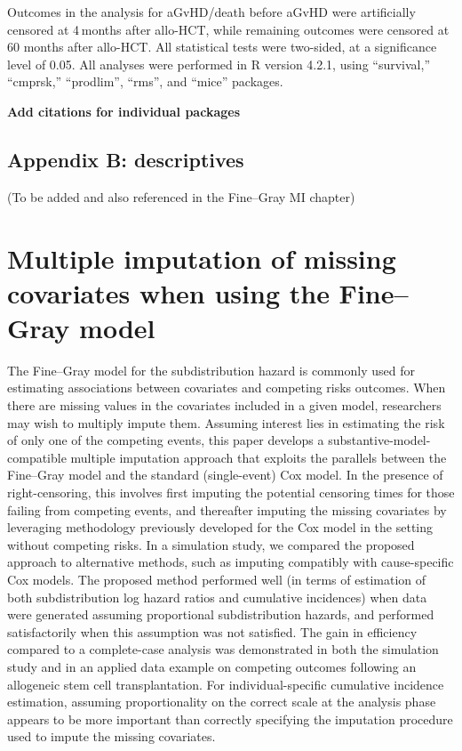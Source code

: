 \documentclass[
  letterpaper,
  DIV=11,
  numbers=noendperiod]{scrreprt}
\begin{document}
Outcomes in the analysis for aGvHD/death before aGvHD were artificially
censored at 4 months after allo-HCT, while remaining outcomes were
censored at 60 months after allo-HCT. All statistical tests were
two-sided, at a significance level of 0.05. All analyses were performed
in R version 4.2.1, using ``survival,'' ``cmprsk,'' ``prodlim'',
``rms'', and ``mice'' packages.

\textbf{Add citations for individual packages}

\section*{Appendix B: descriptives}\label{appendix-b-descriptives}


(To be added and also referenced in the Fine--Gray MI chapter)


\chapter{Multiple imputation of missing covariates when using the
Fine--Gray model}\label{sec-chap-FG-MI}

The Fine--Gray model for the subdistribution hazard is commonly used for
estimating associations between covariates and competing risks outcomes.
When there are missing values in the covariates included in a given
model, researchers may wish to multiply impute them. Assuming interest
lies in estimating the risk of only one of the competing events, this
paper develops a substantive-model-compatible multiple imputation
approach that exploits the parallels between the Fine--Gray model and
the standard (single-event) Cox model. In the presence of
right-censoring, this involves first imputing the potential censoring
times for those failing from competing events, and thereafter imputing
the missing covariates by leveraging methodology previously developed
for the Cox model in the setting without competing risks. In a
simulation study, we compared the proposed approach to alternative
methods, such as imputing compatibly with cause-specific Cox models. The
proposed method performed well (in terms of estimation of both
subdistribution log hazard ratios and cumulative incidences) when data
were generated assuming proportional subdistribution hazards, and
performed satisfactorily when this assumption was not satisfied. The
gain in efficiency compared to a complete-case analysis was demonstrated
in both the simulation study and in an applied data example on competing
outcomes following an allogeneic stem cell transplantation. For
individual-specific cumulative incidence estimation, assuming
proportionality on the correct scale at the analysis phase appears to be
more important than correctly specifying the imputation procedure used
to impute the missing covariates.
\end{document}
